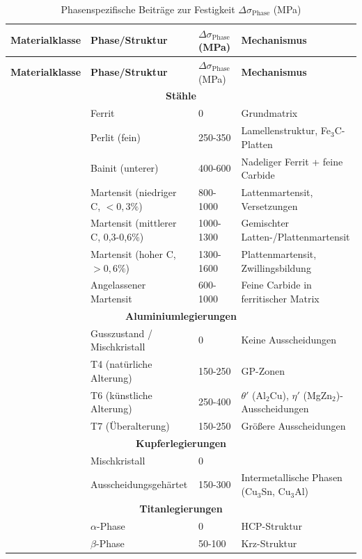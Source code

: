 \documentclass[12pt,a4paper]{article}
\begin{document}
\begin{longtable}{p{3.5cm}p{3.0cm}p{3.0cm}p{4cm}}
	\caption{Phasenspezifische Beiträge zur Festigkeit \(\Delta\sigma_{\text{Phase}}\) (MPa)} \label{tab:phase-contributions} \\
	\toprule
	\textbf{Materialklasse} & \textbf{Phase/Struktur} & \(\Delta\sigma_{\text{Phase}}\) (MPa) & \textbf{Mechanismus} \\
	\midrule
	\endfirsthead
	\toprule
	\textbf{Materialklasse} & \textbf{Phase/Struktur} & \(\Delta\sigma_{\text{Phase}}\) (MPa) & \textbf{Mechanismus} \\
	\midrule
	\endhead
	\multicolumn{4}{c}{\textbf{Stähle}} \\
	& Ferrit & 0 & Grundmatrix \\
	& Perlit (fein) & 250-350 & Lamellenstruktur, Fe\(_3\)C-Platten \\
	& Bainit (unterer) & 400-600 & Nadeliger Ferrit + feine Carbide \\
	& Martensit (niedriger C, \(<0,3\%\)) & 800-1000 & Lattenmartensit, Versetzungen \\
	& Martensit (mittlerer C, 0,3-0,6\%) & 1000-1300 & Gemischter Latten-/Plattenmartensit \\
	& Martensit (hoher C, \(>0,6\%\)) & 1300-1600 & Plattenmartensit, Zwillingsbildung \\
	& Angelassener Martensit & 600-1000 & Feine Carbide in ferritischer Matrix \\
	\hline
	\multicolumn{4}{c}{\textbf{Aluminiumlegierungen}} \\
	& Gusszustand / Mischkristall & 0 & Keine Ausscheidungen \\
	& T4 (natürliche Alterung) & 150-250 & GP-Zonen \\
	& T6 (künstliche Alterung) & 250-400 & \(\theta'\) (Al\(_2\)Cu), \(\eta'\) (MgZn\(_2\))-Ausscheidungen \\
	& T7 (Überalterung) & 150-250 & Größere Ausscheidungen \\
	\hline
	\multicolumn{4}{c}{\textbf{Kupferlegierungen}} \\
	& Mischkristall & 0 & \\
	& Ausscheidungsgehärtet & 150-300 & Intermetallische Phasen (Cu\(_3\)Sn, Cu\(_3\)Al) \\
	\hline
	\multicolumn{4}{c}{\textbf{Titanlegierungen}} \\
	& \(\alpha\)-Phase & 0 & HCP-Struktur \\
	& \(\beta\)-Phase & 50-100 & Krz-Struktur \\

\end{longtable}
\end{document}
